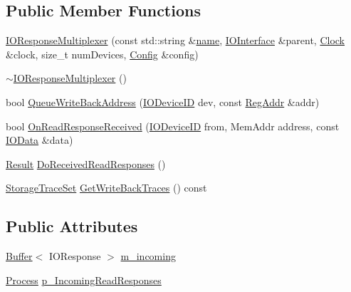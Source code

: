 \subsection*{Public Member Functions}
\begin{DoxyCompactItemize}
\item 
\hyperlink{class_simulator_1_1drisc_1_1_i_o_response_multiplexer_ad8ad7416aab9bf75d8ce5abcd34954eb}{I\+O\+Response\+Multiplexer} (const std\+::string \&\hyperlink{mtconf_8c_a8f8f80d37794cde9472343e4487ba3eb}{name}, \hyperlink{class_simulator_1_1drisc_1_1_i_o_interface}{I\+O\+Interface} \&parent, \hyperlink{class_simulator_1_1_clock}{Clock} \&clock, size\+\_\+t num\+Devices, \hyperlink{class_config}{Config} \&config)
\item 
\hyperlink{class_simulator_1_1drisc_1_1_i_o_response_multiplexer_a5af33eff83e313c3bf471570f919b8da}{$\sim$\+I\+O\+Response\+Multiplexer} ()
\item 
bool \hyperlink{class_simulator_1_1drisc_1_1_i_o_response_multiplexer_afa3699ab9853579b952c8bbec75ad6ef}{Queue\+Write\+Back\+Address} (\hyperlink{namespace_simulator_a3493d987c866ad6b8aaa704c42502db0}{I\+O\+Device\+I\+D} dev, const \hyperlink{struct_simulator_1_1_reg_addr}{Reg\+Addr} \&addr)
\item 
bool \hyperlink{class_simulator_1_1drisc_1_1_i_o_response_multiplexer_ae5e5ee38b3897dd2e9a93dd6ec2b9389}{On\+Read\+Response\+Received} (\hyperlink{namespace_simulator_a3493d987c866ad6b8aaa704c42502db0}{I\+O\+Device\+I\+D} from, Mem\+Addr address, const \hyperlink{struct_simulator_1_1_i_o_data}{I\+O\+Data} \&data)
\item 
\hyperlink{namespace_simulator_a4b6b5616e7236c0c131516a441776805}{Result} \hyperlink{class_simulator_1_1drisc_1_1_i_o_response_multiplexer_a46fca063c99af198a284bb64e12adba3}{Do\+Received\+Read\+Responses} ()
\item 
\hyperlink{class_simulator_1_1_storage_trace_set}{Storage\+Trace\+Set} \hyperlink{class_simulator_1_1drisc_1_1_i_o_response_multiplexer_ac9408328bbc7b4edc0705c49699443e4}{Get\+Write\+Back\+Traces} () const 
\end{DoxyCompactItemize}
\subsection*{Public Attributes}
\begin{DoxyCompactItemize}
\item 
\hyperlink{class_simulator_1_1_buffer}{Buffer}$<$ I\+O\+Response $>$ \hyperlink{class_simulator_1_1drisc_1_1_i_o_response_multiplexer_ae4b08146efe17bd050928d579e7b27be}{m\+\_\+incoming}
\item 
\hyperlink{class_simulator_1_1_process}{Process} \hyperlink{class_simulator_1_1drisc_1_1_i_o_response_multiplexer_ae1734f76ad36396e574be9a2d7c26eb7}{p\+\_\+\+Incoming\+Read\+Responses}
\end{DoxyCompactItemize}



